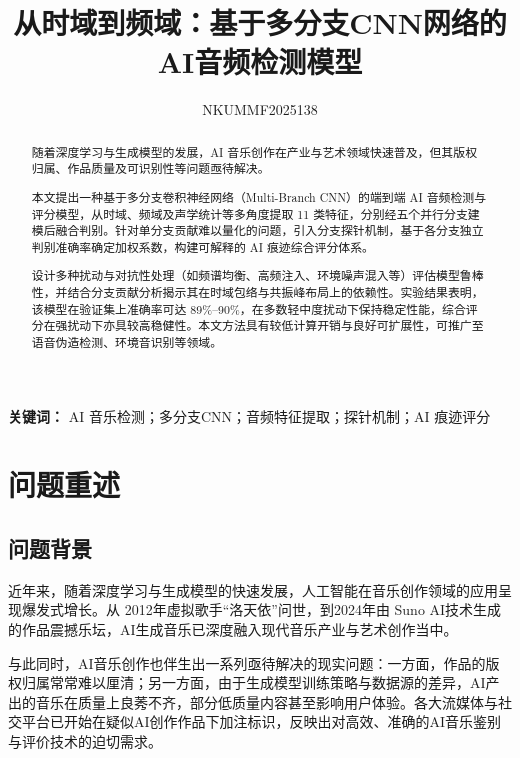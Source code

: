 \documentclass[a4paper,12pt]{article}
\title{从时域到频域：基于多分支CNN网络的AI音频检测模型}
\author{NKUMMF2025138}
\date{}
\begin{document}
\maketitle
\thispagestyle{plain}  %


\begin{abstract}
随着深度学习与生成模型的发展，AI 音乐创作在产业与艺术领域快速普及，但其版权归属、作品质量及可识别性等问题亟待解决。

本文提出一种基于多分支卷积神经网络（Multi-Branch CNN）的端到端 AI 音频检测与评分模型，从时域、频域及声学统计等多角度提取 11 类特征，分别经五个并行分支建模后融合判别。针对单分支贡献难以量化的问题，引入分支探针机制，基于各分支独立判别准确率确定加权系数，构建可解释的 AI 痕迹综合评分体系。

设计多种扰动与对抗性处理（如频谱均衡、高频注入、环境噪声混入等）评估模型鲁棒性，并结合分支贡献分析揭示其在时域包络与共振峰布局上的依赖性。实验结果表明，该模型在验证集上准确率可达 89\%–90\%，在多数轻中度扰动下保持稳定性能，综合评分在强扰动下亦具较高稳健性。本文方法具有较低计算开销与良好可扩展性，可推广至语音伪造检测、环境音识别等领域。
\end{abstract}
\vspace{1em}
\noindent\textbf{关键词：} AI 音乐检测；多分支CNN；音频特征提取；探针机制；AI 痕迹评分

\newpage  

\tableofcontents 
\newpage  

\section{问题重述}
\subsection{问题背景}

近年来，随着深度学习与生成模型的快速发展，人工智能在音乐创作领域的应用呈现爆发式增长。从 2012年虚拟歌手“洛天依”问世，到2024年由 Suno AI技术生成的作品震撼乐坛，AI生成音乐已深度融入现代音乐产业与艺术创作当中。

与此同时，AI音乐创作也伴生出一系列亟待解决的现实问题：一方面，作品的版权归属常常难以厘清；另一方面，由于生成模型训练策略与数据源的差异，AI产出的音乐在质量上良莠不齐，部分低质量内容甚至影响用户体验。各大流媒体与社交平台已开始在疑似AI创作作品下加注标识，反映出对高效、准确的AI音乐鉴别与评价技术的迫切需求。
\end{document}
